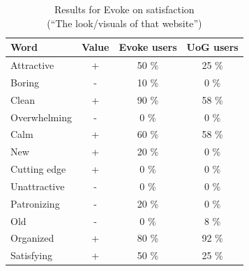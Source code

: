 \begin{table}[htbp]
\begin{minipage}{.7\textwidth}
    \begin{tabular}{p{1in}ccc}
    \toprule
        \textbf{Word} & \textbf{Value} & \textbf{Evoke users} & \textbf{UoG users} \\ 
    \midrule
        Attractive & + & 50 \% & 25 \% \\
        Boring & - & 10 \% & 0 \% \\
        Clean & + & 90 \% & 58 \% \\
        Overwhelming & - & 0 \% & 0 \% \\
        Calm & + & 60 \% & 58 \% \\
        New & + & 20 \% & 0 \% \\
        Cutting edge & + & 0 \% & 0 \% \\
        Unattractive & - & 0 \% & 0 \% \\
        Patronizing & - & 20 \% & 0 \% \\
        Old & - & 0 \% & 8 \% \\
        Organized & + & 80 \% & 92 \% \\
        Satisfying & + & 50 \% & 25 \% \\
    \midrule
    \end{tabular}
    \caption[]{\label{table:Stolk2021x:eval:Evoke-satisfaction}Results for Evoke on satisfaction\\(``The look/visuals of that website'')}
\end{minipage}
\begin{minipage}{.25\textwidth}
  
\end{minipage}
\end{table}



